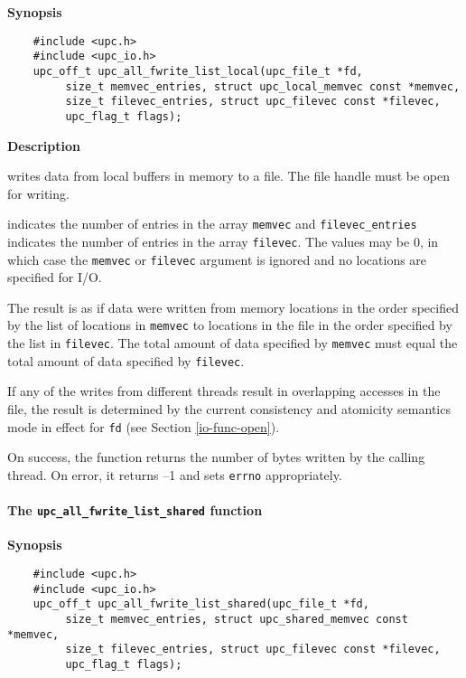 {\bf Synopsis}

\npf\vspace{-2.5em}
\begin{verbatim}
    #include <upc.h>
    #include <upc_io.h>
    upc_off_t upc_all_fwrite_list_local(upc_file_t *fd,
         size_t memvec_entries, struct upc_local_memvec const *memvec,
         size_t filevec_entries, struct upc_filevec const *filevec, 
         upc_flag_t flags);
\end{verbatim}

{\bf Description}

 writes data from local buffers in memory to
a file. The file handle must be open for writing.

 indicates the number of entries in the array {\tt memvec} and
{\tt filevec\_entries} indicates the number of entries in the array {\tt filevec}. The
values may be 0, in which case the {\tt memvec} or {\tt filevec} argument is ignored and
no locations are specified for I/O.

\np The result is as if data were written from memory locations in the order
specified by the list of locations in {\tt memvec} to locations in the file in the
order specified by the list in {\tt filevec}. The total amount of data specified
by {\tt memvec} must equal the total amount of data specified by {\tt filevec}.

\np If any of the writes from different threads result in overlapping accesses
in the file, the result is determined by the current consistency and atomicity
semantics mode in effect for {\tt fd} (see Section \ref{io-func-open}).

\np On success, the function returns the number of bytes written by the
calling thread. On error, it returns --1 and sets {\tt errno} appropriately.

\paragraph{The {\tt upc\_all\_fwrite\_list\_shared} function}

{\bf Synopsis}

\npf\vspace{-2.5em}
\begin{verbatim}
    #include <upc.h>
    #include <upc_io.h>
    upc_off_t upc_all_fwrite_list_shared(upc_file_t *fd,
         size_t memvec_entries, struct upc_shared_memvec const *memvec,
         size_t filevec_entries, struct upc_filevec const *filevec,
         upc_flag_t flags);
\end{verbatim}

